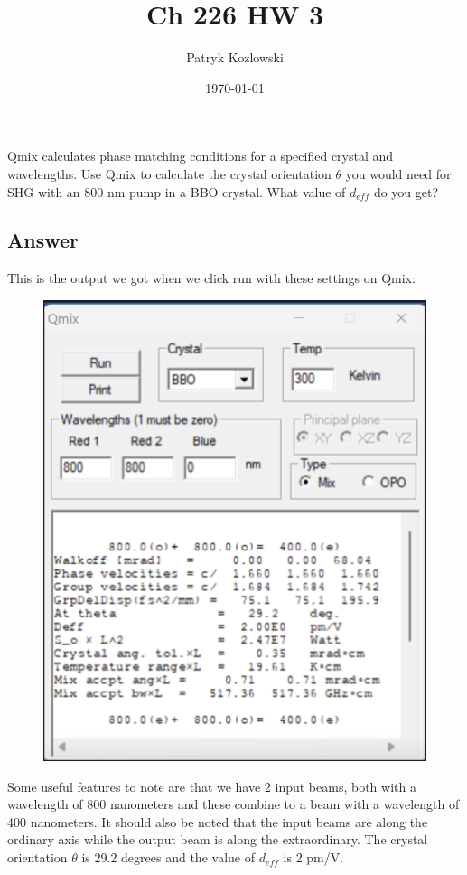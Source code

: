 \documentclass[12pt]{article}
\title{Ch 226 HW 3}
\author{Patryk Kozlowski}
\date{\today}
\begin{document}
\maketitle
\section{}
Qmix calculates phase matching conditions for a specified crystal and wavelengths. Use Qmix to calculate the crystal orientation $\theta$ you would need for SHG with an 800 nm pump in a BBO crystal. What value of $d_{eff}$ do you get?
\subsection{Answer}
This is the output we got when we click run with these settings on Qmix:
\begin{figure}
\includegraphics[width=\textwidth]{1.png}
\end{figure}
Some useful features to note are that we have 2 input beams, both with a wavelength of 800 nanometers and these combine to a beam with a wavelength of 400 nanometers. It should also be noted that the input beams are along the ordinary axis while the output beam is along the extraordinary. The crystal orientation $\theta$ is 29.2 degrees and the value of $d_{eff}$ is 2 pm/V.
\newpage
\end{document}
